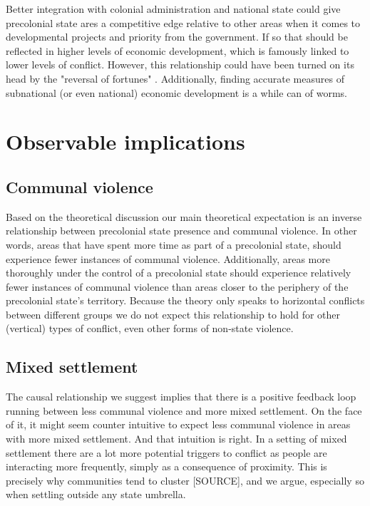 \documentclass[12pt]{article}
\begin{document}
Better integration with colonial administration and national state could give
precolonial state ares a competitive edge relative to other areas when it comes
to developmental projects and priority from the government. If so that should be
reflected in higher levels of economic development, which is famously linked to
lower levels of conflict. However, this relationship could have been turned on
its head by the "reversal of fortunes" \citep{Acemoglu_2002}. Additionally,
finding accurate measures of subnational (or even national) economic development
is a while can of worms.

\section{Observable implications}


\subsection{Communal violence}

Based on the theoretical discussion our main theoretical expectation is an
inverse relationship between precolonial state presence and communal violence.
In other words, areas that have spent more time as part of a precolonial state,
should experience fewer instances of communal violence. Additionally, areas more
thoroughly under the control of a precolonial state should experience relatively
fewer instances of communal violence than areas closer to the periphery of the
precolonial state's territory. Because the theory only speaks to horizontal
conflicts between different groups we do not expect this relationship to hold
for other (vertical) types of conflict, even other forms of non-state violence. 

\subsection{Mixed settlement}

The causal relationship we suggest implies that there is a positive feedback
loop running between less communal violence and more mixed settlement. On the
face of it, it might seem counter intuitive to expect less communal violence in
areas with more mixed settlement. And that intuition is right. In a setting of
mixed settlement there are a lot more potential triggers to conflict as people
are interacting more frequently, simply as a consequence of proximity.  This is
precisely why communities tend to cluster [SOURCE], and we argue, especially so
when settling outside any state umbrella.
\end{document}
